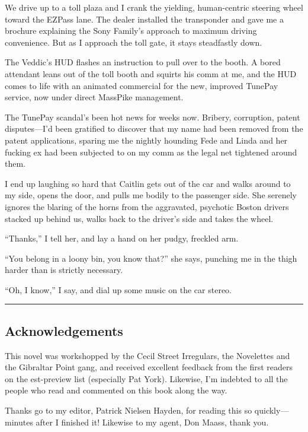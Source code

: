 We drive up to a toll plaza and I crank the yielding, human-centric
steering wheel toward the EZPass lane. The dealer installed the
transponder and gave me a brochure explaining the Sony Family’s
approach to maximum driving convenience. But as I approach the toll
gate, it stays steadfastly down.

The Veddic’s HUD flashes an instruction to pull over to the booth.
A bored attendant leans out of the toll booth and squirts his comm
at me, and the HUD comes to life with an animated commercial for
the new, improved TunePay service, now under direct MassPike
management.

The TunePay scandal’s been hot news for weeks now. Bribery,
corruption, patent disputes—I’d been gratified to discover that my
name had been removed from the patent applications, sparing me the
nightly hounding Fede and Linda and her fucking ex had been
subjected to on my comm as the legal net tightened around them.

I end up laughing so hard that Caitlin gets out of the car and
walks around to my side, opens the door, and pulls me bodily to the
passenger side. She serenely ignores the blaring of the horns from
the aggravated, psychotic Boston drivers stacked up behind us,
walks back to the driver’s side and takes the wheel.

“Thanks,” I tell her, and lay a hand on her pudgy, freckled arm.

“You belong in a loony bin, you know that?” she says, punching me
in the thigh harder than is strictly necessary.

“Oh, I know,” I say, and dial up some music on the car stereo.

\begin{center}\rule{3in}{0.4pt}\end{center}

\subsection{Acknowledgements}

This novel was workshopped by the Cecil Street Irregulars, the
Novelettes and the Gibraltar Point gang, and received excellent
feedback from the first readers on the est-preview list (especially
Pat York). Likewise, I’m indebted to all the people who read and
commented on this book along the way.

Thanks go to my editor, Patrick Nielsen Hayden, for reading this so
quickly—minutes after I finished it! Likewise to my agent, Don
Maass, thank you.

